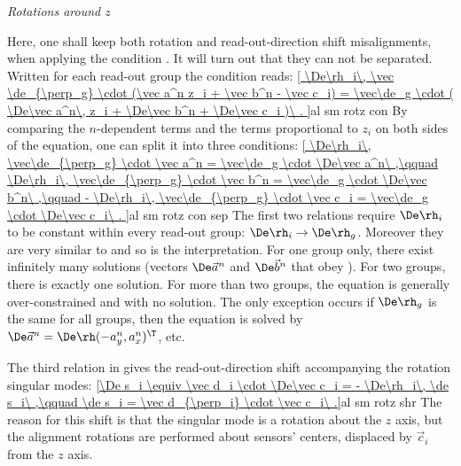 
\baselineskip
\indent\em{Rotations around $z$}

Here, one shall keep both rotation and read-out-direction shift misalignments, when applying the condition . It will turn out that they can not be separated. Written for each read-out group the condition reads:
\eqref{
	\De\rh_i\, \vec \de_{\perp_g} \cdot (\vec a^n z_i + \vec b^n - \vec c_i) =
	\vec\de_g \cdot (
		\De\vec a^n\, z_i +
		\De\vec b^n +
		\De\vec c_i
	)\ .
}{al sm rotz con}
By comparing the $n$-dependent terms and the terms proportional to $z_i$ on both sides of the equation, one can split it into three conditions:
\eqref{
	\De\rh_i\, \vec\de_{\perp_g} \cdot \vec a^n = \vec\de_g \cdot \De\vec a^n\ ,\qquad
	\De\rh_i\, \vec\de_{\perp_g} \cdot \vec b^n = \vec\de_g \cdot \De\vec b^n\ ,\qquad
	- \De\rh_i\, \vec\de_{\perp_g} \cdot \vec c_i = \vec\de_g \cdot \De\vec c_i\ .
}{al sm rotz con sep}
The first two relations require $\De\rh_i$ to be constant within every read-out group: $\De\rh_i \rightarrow \De\rh_g$. Moreover they are very similar to  and so is the interpretation. For one group only, there exist infinitely many solutions (vectors $\De\vec a^n$ and $\De\vec b^n$ that obey ). For two groups, there is exactly one solution. For more than two groups, the equation is generally over-constrained and with no solution. The only exception occurs if $\De\rh_g$ is the same for all groups, then the equation is solved by $\De\vec a^n = \De\rh (-a^n_y, a^n_x)^\T$, etc.

The third relation in  gives the read-out-direction shift accompanying the rotation singular modes:
\eqref{\De s_i \equiv \vec d_i \cdot \De\vec c_i = - \De\rh_i\, \de s_i\ ,\qquad \de s_i = \vec d_{\perp_i} \cdot \vec c_i\ .}{al sm rotz shr}
The reason for this shift is that the singular mode is a rotation about the $z$ axis, but the alignment rotations are performed about sensors' centers, displaced by $\vec c_i$ from the $z$ axis.


